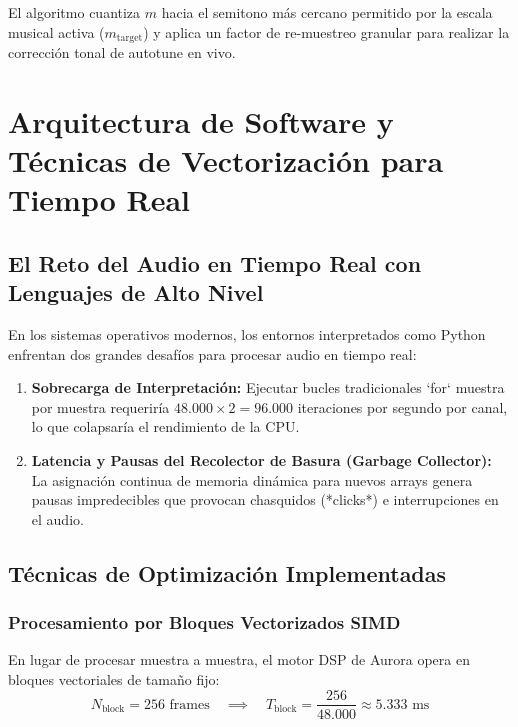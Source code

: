 \documentclass[11pt,a4paper]{article}
\begin{document}
El algoritmo cuantiza $m$ hacia el semitono más cercano permitido por la escala musical activa ($m_{\text{target}}$) y aplica un factor de re-muestreo granular para realizar la corrección tonal de autotune en vivo.

\section{Arquitectura de Software y Técnicas de Vectorización para Tiempo Real}

\subsection{El Reto del Audio en Tiempo Real con Lenguajes de Alto Nivel}
En los sistemas operativos modernos, los entornos interpretados como Python enfrentan dos grandes desafíos para procesar audio en tiempo real:
\begin{enumerate}
    \item \textbf{Sobrecarga de Interpretación:} Ejecutar bucles tradicionales `for` muestra por muestra requeriría $48.000 \times 2 = 96.000$ iteraciones por segundo por canal, lo que colapsaría el rendimiento de la CPU.
    \item \textbf{Latencia y Pausas del Recolector de Basura (Garbage Collector):} La asignación continua de memoria dinámica para nuevos arrays genera pausas impredecibles que provocan chasquidos (*clicks*) e interrupciones en el audio.
\end{enumerate}

\subsection{Técnicas de Optimización Implementadas}

\subsubsection{Procesamiento por Bloques Vectorizados SIMD}
En lugar de procesar muestra a muestra, el motor DSP de Aurora opera en bloques vectoriales de tamaño fijo:
\begin{equation}
N_{\text{block}} = 256 \text{ frames} \quad \implies \quad T_{\text{block}} = \frac{256}{48.000} \approx 5.333\text{ ms}
\end{equation}
\end{document}
